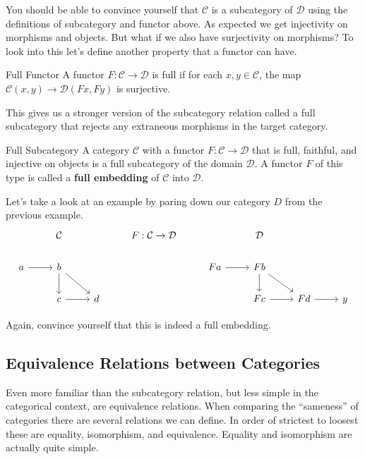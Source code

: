 \documentclass[12pt]{article}
\newcounter{examp}
\begin{document}
You should be able to convince yourself that $\mathcal{C}$ is a subcategory of $\mathcal{D}$ using the definitions of subcategory and functor above.
As expected we get injectivity on morphisms and objects.
But what if we also have surjectivity on morphisms?
To look into this let's define another property that a functor can have.

\begin{definition}{Full Functor}{}
  A functor $F:\mathcal{C}\rightarrow\mathcal{D}$ is full if for each $x,y\in\mathcal{C}$, the map $\mathcal{C}(x, y)\rightarrow\mathcal{D}(Fx,Fy)$ is surjective.
\end{definition}

This gives us a stronger version of the subcategory relation called a full subcategory that rejects any extraneous morphisms in the target category.

\begin{definition}{Full Subcategory}{}
  A category $\mathcal{C}$ with a functor $F:\mathcal{C}\rightarrow\mathcal{D}$ that is full, faithful, and injective on objects is a full subcategory of the domain $\mathcal{D}$.
  A functor $F$ of this type is called a \textbf{full embedding} of $\mathcal{C}$ into $\mathcal{D}$.
\end{definition}

Let's take a look at an example by paring down our category $D$ from the previous example.
\[\begin{tikzcd}
    & {\mathcal{C}} && {F:\mathcal{C}\rightarrow\mathcal{D}} && {\mathcal{D}} \\
    a & b &&& Fa & Fb \\
    & c & d &&& Fc & Fd & y
    \arrow[from=2-1, to=2-2]
    \arrow[from=2-2, to=3-2]
    \arrow[from=3-2, to=3-3]
    \arrow[from=2-2, to=3-3]
    \arrow[from=2-5, to=2-6]
    \arrow[from=2-6, to=3-7]
    \arrow[from=3-6, to=3-7]
    \arrow[from=2-6, to=3-6]
    \arrow[from=3-7, to=3-8]
  \end{tikzcd}\]

Again, convince yourself that this is indeed a full embedding.



\subsection*{Equivalence Relations between Categories}
Even more familiar than the subcategory relation, but less simple in the categorical context, are equivalence relations.
When comparing the ``sameness'' of categories there are several relations we can define.
In order of strictest to loosest these are equality, isomorphism, and equivalence.
Equality and isomorphism are actually quite simple.
\end{document}
